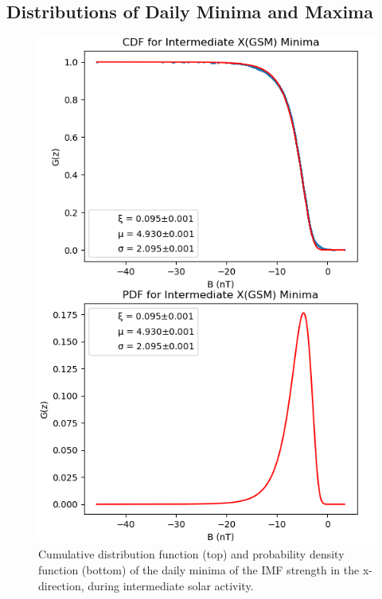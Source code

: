 \documentclass[11pt]{article}
\begin{document}
    \subsection{Distributions of Daily Minima and Maxima}\label{sec:dailydist}
        \begin{figure}[t!]
            \begin{minipage}{0.48\textwidth}
                \centering
                \includegraphics[width=\textwidth]{fig_method/MFIintXmin.png}
                \caption{Cumulative distribution function (top) and probability density function (bottom) of the daily minima of the IMF strength in the x-direction, during intermediate solar activity.}
                \label{fig:MFIintXmin}
            \end{minipage}
            \hfill

\end{figure}
\end{document}

